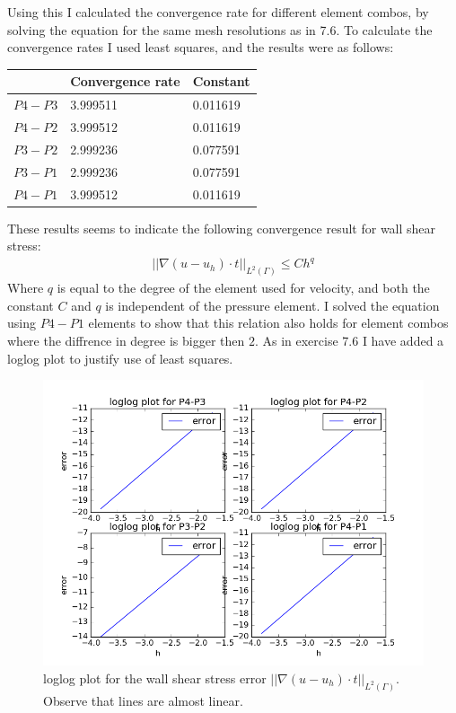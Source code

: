\documentclass[11pt,a4paper]{report}
\begin{document}
Using this I calculated the convergence rate for different element combos, by solving the equation for the same mesh resolutions as in 7.6. To calculate the convergence rates I used least squares, and the results were as follows:
\begin{center}
    \begin{tabular}{| l | l | l |}
    \hline
     & Convergence rate & Constant   \\ \hline
    $P4-P3$ & 3.999511 & 0.011619    \\ \hline
    $P4-P2$ & 3.999512 & 0.011619	\\ \hline
    $P3-P2$ & 2.999236 & 0.077591    \\ \hline
    $P3-P1$ & 2.999236 & 0.077591	\\ \hline
    	$P4-P1$ & 3.999512 & 0.011619	\\ \hline
    \end{tabular}
\end{center}
These results seems to indicate the following convergence result for wall shear stress:
\begin{align*}
||\nabla (u-u_h)\cdot t||_{L^2(\Gamma)} \leq Ch^q
\end{align*} 
Where $q$ is equal to the degree of the element used for velocity, and both the constant $C$ and $q$ is independent of the pressure element. I solved the equation using $P4-P1$ elements to show that this relation also holds for element combos where the diffrence in degree is bigger then $2$. As in exercise 7.6 I have added a loglog plot to justify use of least squares.
\begin{figure}
  \includegraphics[width=\linewidth]{stress_con.png}
  \caption{loglog plot for the wall shear stress error $||\nabla (u-u_h)\cdot t||_{L^2(\Gamma)}$. Observe that lines are almost linear.}
  \label{Fig 2}
\end{figure}
\end{document}
